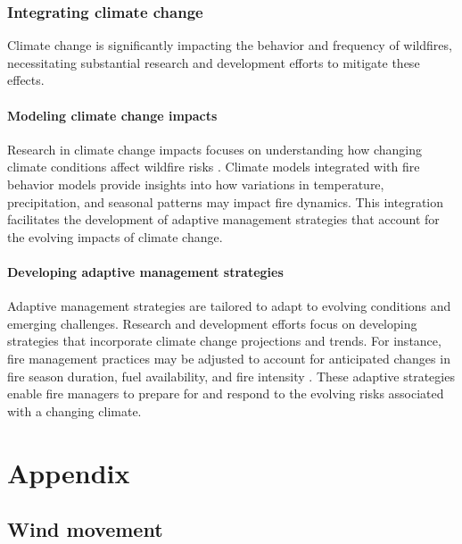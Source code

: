 \documentclass[
  12 pt,
]{Nemilov}
\begin{document}
\section{Integrating climate change}\label{integrating-climate-change}

Climate change is significantly impacting the behavior and frequency of wildfires, necessitating substantial research and development efforts to mitigate these effects.

\subsection{Modeling climate change impacts}\label{modeling-climate-change-impacts}

Research in climate change impacts focuses on understanding how changing climate conditions affect wildfire risks \citep{an2015assessing}. Climate models integrated with fire behavior models provide insights into how variations in temperature, precipitation, and seasonal patterns may impact fire dynamics. This integration facilitates the development of adaptive management strategies that account for the evolving impacts of climate change.

\subsection{Developing adaptive management strategies}\label{developing-adaptive-management-strategies}

Adaptive management strategies are tailored to adapt to evolving conditions and emerging challenges. Research and development efforts focus on developing strategies that incorporate climate change projections and trends. For instance, fire management practices may be adjusted to account for anticipated changes in fire season duration, fuel availability, and fire intensity \citep{busenberg2004adaptive, prudencio2018impacts}. These adaptive strategies enable fire managers to prepare for and respond to the evolving risks associated with a changing climate.

\part{Appendix}\label{part-appendix}

\chapter{Wind movement}\label{wind-movement}
\end{document}

